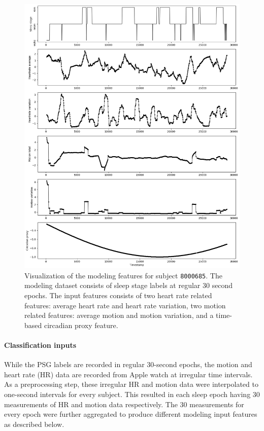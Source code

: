 \documentclass[12pt]{article}
\begin{document}
\begin{figure}
\centering
\includegraphics[width=\textwidth]{figures/8000685_features.png}
\caption{Visualization of the modeling features for subject \texttt{8000685}. The modeling dataset consists of sleep stage labels at regular 30 second epochs. The input features consists of two heart rate related features: average heart rate and heart rate variation, two motion related features: average motion and motion variation, and a time-based circadian proxy feature.}
\label{fig:8000685_features}
\end{figure}

\paragraph{Classification inputs}
While the PSG labels are recorded in regular 30-second epochs,  the motion and heart rate (HR) data are recorded from Apple watch at irregular time intervals. As a preprocessing step, these irregular HR and motion data were interpolated to one-second intervals for every subject. This resulted in each sleep epoch having 30 measurements of HR and motion data respectively. The 30 measurements for every epoch were further aggregated to produce different modeling input features as described below.
\end{document}
